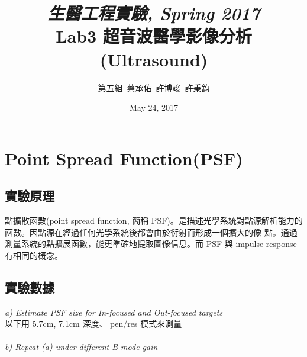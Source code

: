 \documentclass{article}
\title{\emph{生醫工程實驗, Spring 2017}\\ Lab3 超音波醫學影像分析(Ultrasound)}
\author{第五組\ 蔡承佑\ 許博竣\ 許秉鈞}
\date{May 24, 2017} %
\begin{document}
\maketitle


\section{Point Spread Function(PSF)}
\subsection{實驗原理}

點擴散函數(point spread function, 簡稱 PSF)。是描述光學系統對點源解析能力的函數。因點源在經過任何光學系統後都會由於衍射而形成一個擴大的像 點。通過測量系統的點擴展函數，能更準確地提取圖像信息。而 PSF 與 impulse response 有相同的概念。


\subsection{實驗數據}
\emph{a) Estimate PSF size for In-focused and Out-focused targets}  \\
以下用 5.7cm, 7.1cm 深度、 pen/res 模式來測量\\
\\
\emph{b) Repeat (a) under different B-mode gain} \\
\end{document}
